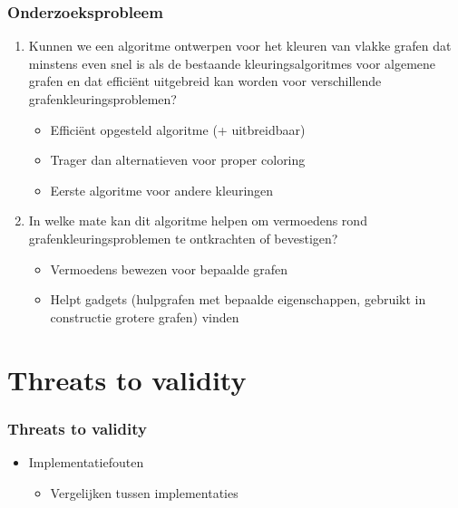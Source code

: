 \documentclass
[kulak] %
{kulakbeamer}
\begin{document}
%	

\begin{frame}
	\frametitle{Onderzoeksprobleem}
	
	\begin{enumerate}
		\item Kunnen we een algoritme ontwerpen voor het kleuren van vlakke grafen dat minstens even snel is als de bestaande kleuringsalgoritmes voor algemene grafen en dat efficiënt uitgebreid kan worden voor verschillende grafenkleuringsproblemen?\pause
		\begin{itemize}
			\item Efficiënt opgesteld algoritme (+ uitbreidbaar)
			\item Trager dan alternatieven voor proper coloring
			\item Eerste algoritme voor andere kleuringen\pause
		\end{itemize}
		\item In welke mate kan dit algoritme helpen om vermoedens rond grafenkleuringsproblemen te ontkrachten of bevestigen?\pause
		\begin{itemize}
			\item Vermoedens bewezen voor bepaalde grafen
			\item Helpt gadgets (hulpgrafen met bepaalde eigenschappen, gebruikt in constructie grotere grafen) vinden
		\end{itemize}
	\end{enumerate}
\end{frame}

\section{Threats to validity}
	
	\begin{frame}
		\frametitle{Threats to validity}
		
		\begin{itemize}
			\item Implementatiefouten
			
			
			\begin{itemize}
				\item Vergelijken tussen implementaties
			\end{itemize}
		\end{itemize}
	\end{frame}
	
\end{document}
